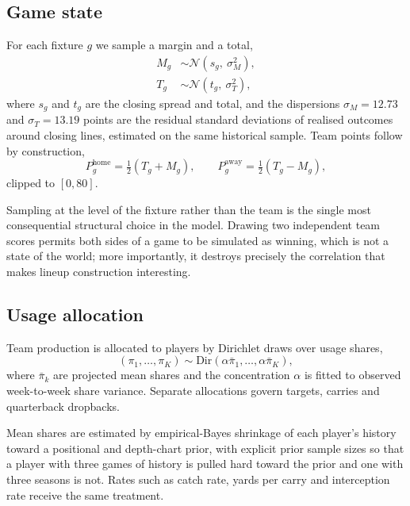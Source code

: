 \documentclass[11pt,a4paper]{article}
\begin{document}
\subsection{Game state}

For each fixture $g$ we sample a margin and a total,
\begin{align}
M_g &\sim \mathcal{N}\!\left(s_g,\ \sigma_M^2\right), \\
T_g &\sim \mathcal{N}\!\left(t_g,\ \sigma_T^2\right),
\end{align}
where $s_g$ and $t_g$ are the closing spread and total, and the dispersions
$\sigma_M = 12.73$ and $\sigma_T = 13.19$ points are the residual standard
deviations of realised outcomes around closing lines, estimated on the same
historical sample. Team points follow by construction,
\begin{equation}
P^{\text{home}}_g = \tfrac{1}{2}(T_g + M_g), \qquad
P^{\text{away}}_g = \tfrac{1}{2}(T_g - M_g),
\end{equation}
clipped to $[0, 80]$.

Sampling at the level of the fixture rather than the team is the single most
consequential structural choice in the model. Drawing two independent team
scores permits both sides of a game to be simulated as winning, which is not a
state of the world; more importantly, it destroys precisely the correlation that
makes lineup construction interesting.

\subsection{Usage allocation}

Team production is allocated to players by Dirichlet draws over usage shares,
\begin{equation}
(\pi_{1}, \dots, \pi_{K}) \sim \mathrm{Dir}(\alpha \bar{\pi}_{1}, \dots, \alpha \bar{\pi}_{K}),
\end{equation}
where $\bar{\pi}_k$ are projected mean shares and the concentration $\alpha$ is
fitted to observed week-to-week share variance. Separate allocations govern
targets, carries and quarterback dropbacks.

Mean shares are estimated by empirical-Bayes shrinkage of each player's history
toward a positional and depth-chart prior, with explicit prior sample sizes so
that a player with three games of history is pulled hard toward the prior and
one with three seasons is not. Rates such as catch rate, yards per carry and
interception rate receive the same treatment.
\end{document}

